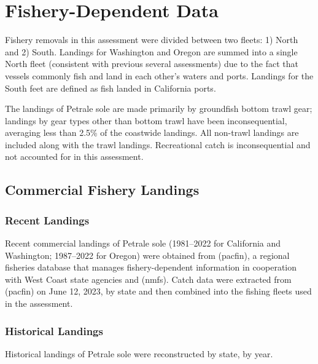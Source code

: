 \documentclass[
]{scrartcl}
\begin{document}
\section{Fishery-Dependent Data}\label{fishery-dependent-data}

Fishery removals in this assessment were divided between two fleets: 1)
North and 2) South. Landings for Washington and Oregon are summed into a
single North fleet (consistent with previous several assessments) due to
the fact that vessels commonly fish and land in each other's waters and
ports. Landings for the South feet are defined as fish landed in
California ports.

The landings of Petrale sole are made primarily by groundfish bottom
trawl gear; landings by gear types other than bottom trawl have been
inconsequential, averaging less than 2.5\% of the coastwide landings.
All non-trawl landings are included along with the trawl landings.
Recreational catch is inconsequential and not accounted for in this
assessment.

\subsection{Commercial Fishery
Landings}\label{commercial-fishery-landings}

\subsubsection{Recent Landings}\label{recent-landings}

Recent commercial landings of Petrale sole (1981--2022 for California
and Washington; 1987--2022 for Oregon) were obtained from (pacfin), a
regional fisheries database that manages fishery-dependent information
in cooperation with West Coast state agencies and (nmfs). Catch data
were extracted from (pacfin) on June 12, 2023, by state and then
combined into the fishing fleets used in the assessment.

\subsubsection{Historical Landings}\label{historical-landings}

Historical landings of Petrale sole were reconstructed by state, by
year.
\end{document}
